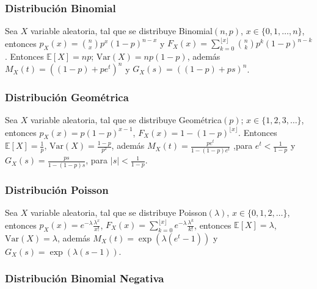 \subsubsection{Distribuci\'on Binomial}

\begin{Def} Sea $X$ variable aleatoria, tal que se distribuye Binomial$(n,p)$, $x \in \{0,1,\dots,n\} $,  entonces $p_X(x) =\binom{n}{x}p^{x}(1-p)^{n-x}$ y $F_X(x)=\sum_{k=0}^{\lfloor x \rfloor}\binom{n}{k} p^{k}(1-p)^{n-k}$.  Entonces  $\mathbb{E}[X]=np$; $\mathrm{Var}(X)=np(1-p)$, adem\'as $M_X(t) = \left((1-p)+pe^{t}\right)^{n}$ y $G_X(s) = \left((1-p)+ps\right)^{n}$.
\end{Def}

\subsubsection{Distribuci\'on Geom\'etrica}

\begin{Def} Sea $X$ variable aleatoria, tal que se distribuye Geom\'etrica$(p)$;  $x \in \{1,2,3,\dots\}$, entonces
$p_X(x)=p(1-p)^{x-1}$, $F_X(x)=1-(1-p)^{\lfloor x \rfloor}$. Entonces $\mathbb{E}[X]=\frac{1}{p}$, $\mathrm{Var}(X)= \frac{1-p}{p^{2}}$,  adem\'as $M_X(t) = \frac{pe^{t}}{1-(1-p)e^{t}}$ ,para $ e^{t}<\frac{1}{1-p}$ y 
$G_X(s)=\frac{ps}{1-(1-p)s}$, para  $|s|<\frac{1}{1-p}$.
\end{Def}

\subsubsection{Distribuci\'on Poisson}

\begin{Def} Sea $X$ variable aleatoria, tal que se distribuye Poisson$(\lambda)$, $x \in \{0,1,2,\dots\}$, entonces $p_X(x)=e^{-\lambda}\frac{\lambda^{x}}{x!}$,  $F_X(x) =\sum_{k=0}^{\lfloor x \rfloor} e^{-\lambda}\frac{\lambda^{k}}{k!} $, entonces $\mathbb{E}[X]= \lambda$,  $\mathrm{Var}(X) = \lambda$, adem\'as $M_X(t) = \exp\!\left(\lambda(e^{t}-1)\right)$ y $G_X(s) = \exp\!\left(\lambda(s-1)\right)$.
\end{Def}

\subsubsection{Distribuci\'on Binomial Negativa}

